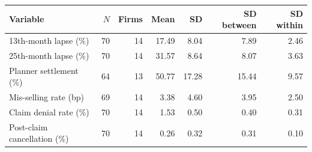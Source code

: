 \begin{tabular}{lrrrrrr}
\toprule
Variable & $N$ & Firms & Mean & SD & SD between & SD within \\
\midrule
13th-month lapse (\%) & 70 & 14 & 17.49 & 8.04 & 7.89 & 2.46 \\
25th-month lapse (\%) & 70 & 14 & 31.57 & 8.64 & 8.07 & 3.63 \\
Planner settlement (\%) & 64 & 13 & 50.77 & 17.28 & 15.44 & 9.57 \\
Mis-selling rate (bp) & 69 & 14 & 3.38 & 4.60 & 3.95 & 2.50 \\
Claim denial rate (\%) & 70 & 14 & 1.53 & 0.50 & 0.40 & 0.31 \\
Post-claim cancellation (\%) & 70 & 14 & 0.26 & 0.32 & 0.31 & 0.10 \\
\bottomrule
\end{tabular}